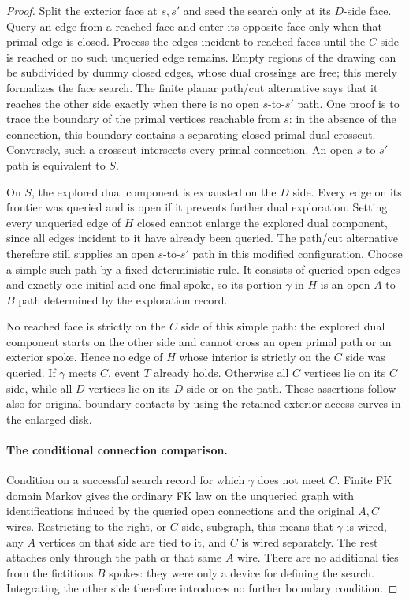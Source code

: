 \begin{proof}
Split the exterior face at $s,s'$ and seed the search only at its
$D$-side face. Query an edge from a reached face and enter its opposite
face only when that primal edge is closed. Process the edges incident
to reached faces until the $C$ side is reached or no such unqueried
edge remains. Empty regions of the drawing can be subdivided by dummy
closed edges, whose dual crossings are free; this merely formalizes
the face search. The finite planar path/cut alternative
says that it reaches the other side exactly when there is no open
$s$-to-$s'$ path. One proof is to trace the boundary of the primal
vertices reachable from $s$: in the absence of the connection,
this boundary contains a separating closed-primal dual crosscut.
Conversely, such a crosscut intersects every primal connection.
An open $s$-to-$s'$ path is equivalent to $S$.

On $S$, the explored dual component is exhausted on the $D$ side.
Every edge on its frontier was queried and is open if it prevents
further dual exploration. Setting every unqueried edge of $H$
closed cannot enlarge the explored dual component, since all
edges incident to it have already been queried. The path/cut
alternative therefore still supplies an open $s$-to-$s'$ path in
this modified configuration. Choose a simple such path by a fixed
deterministic rule. It consists of queried open edges and exactly
one initial and one final spoke, so its portion $\gamma$ in $H$
is an open $A$-to-$B$ path determined by the exploration
record.

No reached face is strictly on the $C$ side of this simple path:
the explored dual component starts on the other side and cannot
cross an open primal path or an exterior spoke. Hence no edge of $H$
whose interior is strictly on the $C$ side was queried. If
$\gamma$ meets $C$, event $T$ already holds. Otherwise all $C$
vertices lie on its $C$ side, while all $D$ vertices lie on its
$D$ side or on the path. These assertions follow also for original
boundary contacts by using the retained exterior access curves in
the enlarged disk.

\paragraph{The conditional connection comparison.}
Condition on a successful search record for which $\gamma$ does
not meet $C$. Finite FK domain Markov gives the ordinary FK law on
the unqueried graph with identifications induced by the queried
open connections and the original $A,C$ wires. Restricting to the
right, or $C$-side, subgraph, this means that $\gamma$ is wired,
any $A$ vertices on that side are tied to it, and $C$ is wired
separately. The rest attaches only through the path or that same
$A$ wire. There are no additional ties from the fictitious $B$
spokes: they were only a device for defining the search. Integrating
the other side therefore introduces no further boundary condition.


\end{proof}
